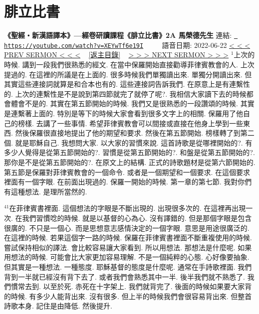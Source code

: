 \documentclass{book}
\begin{document}
\section{腓立比書}
\label{sec:XEYwTf6e19I}
\textbf{《聖經‧新漢語譯本》—經卷研讀課程《腓立比書》2A 馬榮德先生}
\newline
\newline
連結: \href{https://youtube.com/watch?v=XEYwTf6e19I}{\texttt{ https://youtube.com/watch?v=XEYwTf6e19I}} ~~~~ 語音日期: 2022-06-22 
\newline
\newline
\hyperref[sec:io2zo_oCeFk]{\small{< < < PREV SERMON < < <}}
~
\hyperref[sec:index]{\small{[返主目錄]}}
~
\hyperref[sec:fzMfZHATZ0U]{\small{> > > NEXT SERMON > > >}}
\newline
\newline
$^{1}$上次的時候.
講到一段我們很熟悉的經文.
在當中保羅開始直接勸導菲律賓教會的人.
上次提過的.
在這裡的所議是在上面的.
很多時候我們單獨讀出來.
單獨分開讀出來.
但其實這些連接詞就算是和合本也有的.
這些連接詞告訴我們.
在原意上是有連繫性的.
上次的連繫性是不是說到第四節就完了就停了呢?.
我相信大家讀下去的時候都會體會不是的.
其實在第五節開始的時候.
我們又是很熟悉的一段讚頌的時候.
其實是連繫著上面的.
特別是等下的時候大家會看到很多文字上的相關.
保羅用了他自己的榜樣.
去講了一些事情.
希望菲律賓教會可以間接或直接在他身上學到一些東西.
然後保羅很直接地提出了他的期望和要求.
然後在第五節開始.
榜樣轉了到第二個.
就是耶穌自己.
我想問大家.
以大家的習慣來說.
這首詩歌是從哪裡開始的?.
有多少人覺得是從第五節開始的?.
習慣是從第五節開始的?.
和盤是從第五節開始的?.
那你是不是從第五節開始的?.
在原文上的結構.
正式的詩歌題材是從第六節開始的.
第五節是保羅對菲律賓教會的一個命令.
或者是一個期望和一個要求.
在這個要求裡面有一個字眼.
在前面出現過的.
保羅一開始的時候.
第一章的第七節.
我對你們有這種想法.
是理所當然的.

$^{41}$在菲律賓書裡面.
這個想法的字眼是不斷出現的.
出現很多次的.
在這裡再出現一次.
在我們習慣唸的時候.
就是以基督的心為心.
沒有譯錯的.
但是那個字眼是包含很廣的.
不只是一個心.
而是思想意志感情決定的一個字眼.
意思是用途很廣泛的.
在這裡的時候.
若果這個字一路的時候.
保羅在菲律賓書裡面不斷重複使用的時候.
嘗試保持相似的譯法.
會比較容易讓大家看到.
所以用想法.
那想法是什麼呢.
如果用想法的時候.
可能會比大家更加容易理解.
不是一個純粹的心態.
心好像要抽象.
但其實是一種想法.
一種態度.
耶穌基督的態度是什麼呢.
通常在手詩歌裡面.
我們背到一半就已經沒有背下去了.
或者我們會熟悉其中一半.
後半我們就不熟悉了.
我們慣常去到.
以至於死.
赤死在十字架上.
我們就背完了.
後面的時候如果要大家背的時候.
有多少人能背出來.
沒有很多.
但上半的時候我們會很容易背出來.
但整首詩歌本身.
記住是由降低.
然後提升.
\end{document}
